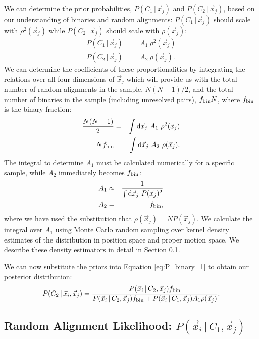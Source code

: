 \documentclass[usenatbib]{mnras}
\newcommand{\given}{\,|\,}
\newcommand{\dd}{\mathrm{d}}
\begin{document}
We can determine the prior probabilities, $P(C_1 \given \vec{x}_j)$ and $P(C_2 \given \vec{x}_j)$, based on our understanding of binaries and random alignments: $P(C_1 \given \vec{x}_j)$ should scale with $\rho^2(\vec{x}_j)$ while $P(C_2 \given \vec{x}_j)$ should scale with $\rho(\vec{x}_j)$:
\begin{eqnarray}
P(C_1 \given \vec{x}_j) &=& A_1\ \rho^2(\vec{x}_j) \\
P(C_2 \given \vec{x}_j) &=& A_2\ \rho(\vec{x}_j).
\end{eqnarray}
We can determine the coefficients of these proportionalities by integrating the relations over all four dimensions of $\vec{x}_j$ which will provide us with the total number of random alignments in the sample, $N(N-1)/2$, and the total number of binaries in the sample (including unresolved pairs), $f_{\rm bin} N$, where $f_{\rm bin}$ is the binary fraction:
\begin{eqnarray}
\frac{N(N-1)}{2} &=& \int \dd \vec{x}_j\ A_1\ \rho^2(\vec{x}_j) \\
N f_{\rm bin} &=& \int \dd \vec{x}_j\ A_2\ \rho(\vec{x}_j).
\end{eqnarray}
The integral to determine $A_1$ must be calculated numerically for a specific sample, while $A_2$ immediately becomes $f_{\rm bin}$:
\begin{eqnarray}
A_1 &\approx& \frac{1}{\int \dd \vec{x}_j\ P(\vec{x}_j)^2} \\
A_2 &=& f_{\rm bin},
\end{eqnarray}
where we have used the substitution that $\rho(\vec{x}_j) = N P(\vec{x}_j)$. We calculate the integral over $A_1$ using Monte Carlo random sampling over kernel density estimates of the distribution in position space and proper motion space. We describe these density estimators in detail in Section \ref{sec:random}.


We can now substitute the priors into Equation \ref{eq:P_binary_1} to obtain our posterior distribution:
\begin{equation}
P(C_2 \given \vec{x}_i, \vec{x}_j) = \frac{P(\vec{x}_i \given C_2, \vec{x}_j) f_{\rm bin} }{P(\vec{x}_i \given C_2, \vec{x}_j) f_{\rm bin}  + P(\vec{x}_i \given C_1, \vec{x}_j) A_1 \rho(\vec{x}_j)  }. \label{eq:P_binary_2}
\end{equation}




\subsection{Random Alignment Likelihood: $P(\vec{x}_i \given C_1, \vec{x}_j)$}
\label{sec:random}
\end{document}
